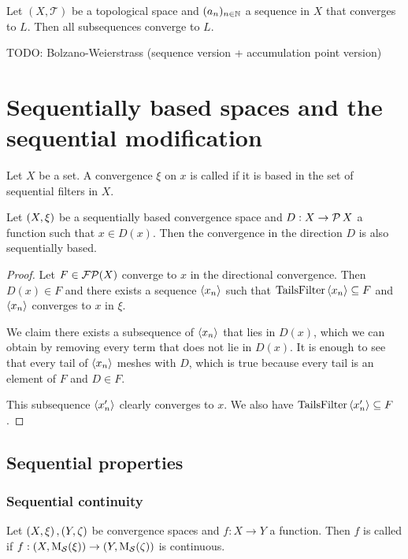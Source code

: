 \begin{lemma} \label{subsequencesConverge}
Let $(X,\mathcal{T})$ be a topological space and $(a_n)_{n\in\mathbb{N}}$ a sequence in $X$ that converges to $L$. Then all subsequences converge to $L$.
\end{lemma}

TODO: Bolzano-Weierstrass (sequence version + accumulation point version)

\section{Sequentially based spaces and the sequential modification}
\begin{definition}
Let $X$ be a set. A convergence $\xi$  on $x$ is called  if it is based in the set of sequential filters in $X$.
\end{definition}

\begin{lemma}
Let $\left( X, \xi \right)$ be a sequentially based convergence space and $D:X\to \operatorname{\mathcal{P}}{X}$ a function such that $x\in D(x)$. Then the convergence in the direction $D$ is also sequentially based.
\end{lemma}
\begin{proof}
Let $F\in \operatorname{\mathcal{FP}}(X)$ converge to $x$ in the directional convergence. Then $D(x)\in F$ and there exists a sequence $\left\langle x_n \right\rangle$ such that $\operatorname{TailsFilter}\left\langle x_n \right\rangle\subseteq F$ and $\left\langle x_n \right\rangle$ converges to $x$ in $\xi$.

We claim there exists a subsequence of $\left\langle x_n \right\rangle$ that lies in $D(x)$, which we can obtain by removing every term that does not lie in $D(x)$. It is enough to see that every tail of $\left\langle x_n \right\rangle$ meshes with $D$, which is true because every tail is an element of $F$ and $D\in F$.

This subsequence $\left\langle x'_n \right\rangle$ clearly converges to $x$. We also have $\operatorname{TailsFilter}\left\langle x_n' \right\rangle\subseteq F$.
\end{proof}

\subsection{Sequential properties}
\subsubsection{Sequential continuity}
\begin{definition}
Let $\left( X,\xi \right), \left( Y,\zeta \right)$ be convergence spaces and $f:X\to Y$ a function. Then $f$ is called  if $f: \left( X, \operatorname{M_\mathcal{S}}(\xi) \right) \to \left( Y, \operatorname{M_\mathcal{S}}(\zeta) \right)$ is continuous.
\end{definition}

